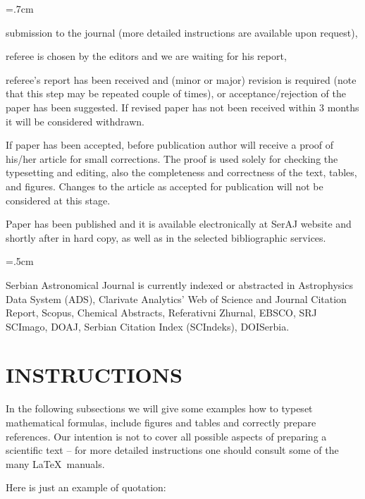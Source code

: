 \documentclass{article_saj}
\begin{document}
\parindent=.7cm

\par\hang{} submission to the journal (more detailed instructions are available upon
request),

\par\hang{} referee is chosen by the editors and we are
waiting for his report,

\par\hang{} referee's report has been received and (minor or major)
revision is required (note that this step may be repeated couple
of times), or acceptance/rejection of the paper has been
suggested. If revised paper has not been received within 3 months it will be
considered withdrawn.

\par\hang{} If paper has been accepted, before publication author
will receive a proof of his/her article for small corrections. The
proof is used solely for checking the typesetting and editing,
also the completeness and correctness of the text, tables, and
figures. Changes to the article as accepted for publication will
not be considered at this stage.

\par\hang{} Paper has been published and it is available electronically at SerAJ website and
shortly after in hard copy, as well
as in the selected bibliographic services.

\parindent=.5cm

Serbian Astronomical Journal is currently indexed or abstracted in
Astrophysics Data System (ADS),
Clarivate Analytics' Web of Science and Journal Citation Report,
Scopus, Chemical Abstracts, Referativni Zhurnal, EBSCO, SRJ SCImago,
DOAJ, Serbian Citation Index (SCIndeks), DOISerbia.

\section{INSTRUCTIONS}

\indent

In the following subsections we will give some examples how to
typeset mathematical formulas, include figures and tables and
correctly prepare references. Our intention is not to cover all possible aspects
of preparing a scientific text -- for more detailed instructions
one should consult some of the many \LaTeX\ manuals.

Here is just an example of quotation:
\end{document}
